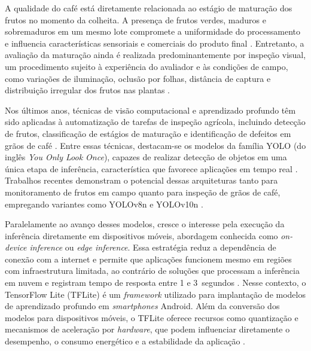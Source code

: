 \documentclass[artigo,times,capa]{iftex2024}
\begin{document}
A qualidade do café está diretamente relacionada ao estágio de maturação dos frutos no momento da colheita. A presença de frutos verdes, maduros e sobremaduros em um mesmo lote compromete a uniformidade do processamento e influencia características sensoriais e comerciais do produto final \cite{Kazama2024Monitoring}. Entretanto, a avaliação da maturação ainda é realizada predominantemente por inspeção visual, um procedimento sujeito à experiência do avaliador e às condições de campo, como variações de iluminação, oclusão por folhas, distância de captura e distribuição irregular dos frutos nas plantas \cite{Bazame2021Detection}.

Nos últimos anos, técnicas de visão computacional e aprendizado profundo têm sido aplicadas à automatização de tarefas de inspeção agrícola, incluindo detecção de frutos, classificação de estágios de maturação e identificação de defeitos em grãos de café \cite{Eron2024Computer}. Entre essas técnicas, destacam-se os modelos da família YOLO (do inglês \textit{You Only Look Once}), capazes de realizar detecção de objetos em uma única etapa de inferência, característica que favorece aplicações em tempo real \cite{Gope2024Comparative}. Trabalhos recentes demonstram o potencial dessas arquiteturas tanto para monitoramento de frutos em campo quanto para inspeção de grãos de café, empregando variantes como YOLOv8n e YOLOv10n \cite{Bazame2021Detection,Kazama2024Monitoring,Gope2024Comparative,Wang2024YOLOv10}.

Paralelamente ao avanço desses modelos, cresce o interesse pela execução da inferência diretamente em dispositivos móveis, abordagem conhecida como \textit{on-device inference} ou \textit{edge inference}. Essa estratégia reduz a dependência de conexão com a internet e
permite que aplicações funcionem mesmo em regiões com infraestrutura
limitada, ao contrário de soluções que processam a inferência em nuvem e
registram tempo de resposta entre 1 e 3~segundos \cite{Thai2024Coffee}. Nesse contexto, o TensorFlow Lite (TFLite) é um \textit{framework} utilizado para implantação de modelos de aprendizado profundo em \textit{smartphones} Android. Além da conversão dos modelos para dispositivos móveis, o \ac{TFLite} oferece recursos como quantização e mecanismos de aceleração por \textit{hardware}, que podem influenciar diretamente o desempenho, o consumo energético e a estabilidade da aplicação \cite{Zhao2022A,Menghani2023Efficient,Chu2023nnPerf}.
\end{document}

